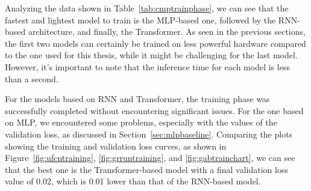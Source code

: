 Analyzing the data shown in Table~\ref{tab:cmptrainphase}, we can see that the fastest and lightest model to train is the MLP-based one, followed by the RNN-based architecture, and finally, the Transformer. As seen in the previous sections, the first two models can certainly be trained on less powerful hardware compared to the one used for this thesis, while it might be challenging for the last model. However, it's important to note that the inference time for each model is less than a second.

For the models based on RNN and Transformer, the training phase was successfully completed without encountering significant issues. For the one based on MLP, we encountered some problems, especially with the values of the validation loss, as discussed in Section~\ref{sec:mlpbaseline}. Comparing the plots showing the training and validation loss curves, as shown in Figure~\ref{fig:ufcntraining}, \ref{fig:grruntraining}, and \ref{fig:gabtrainchart}, we can see that the best one is the Transformer-based model with a final validation loss value of 0.02, which is 0.01 lower than that of the RNN-based model.


